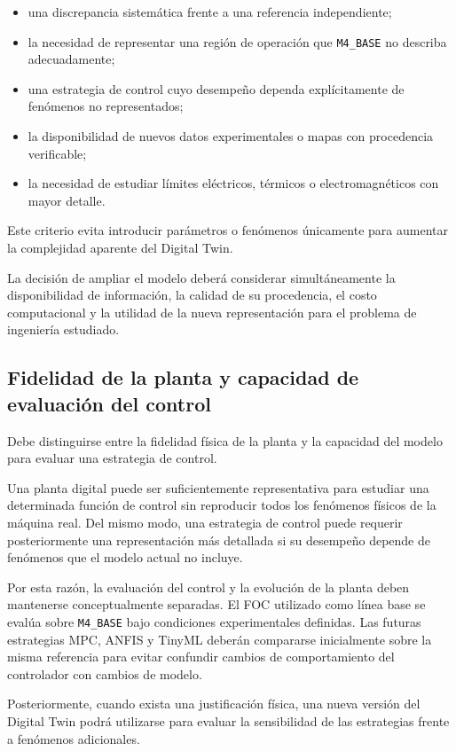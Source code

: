 \begin{itemize}
\item una discrepancia sistemática frente a una referencia independiente;
\item la necesidad de representar una región de operación que \texttt{M4\_BASE} no describa adecuadamente;
\item una estrategia de control cuyo desempeño dependa explícitamente de fenómenos no representados;
\item la disponibilidad de nuevos datos experimentales o mapas con procedencia verificable;
\item la necesidad de estudiar límites eléctricos, térmicos o electromagnéticos con mayor detalle.
\end{itemize}

Este criterio evita introducir parámetros o fenómenos únicamente para aumentar la complejidad aparente del Digital Twin.

La decisión de ampliar el modelo deberá considerar simultáneamente la disponibilidad de información, la calidad de su procedencia, el costo computacional y la utilidad de la nueva representación para el problema de ingeniería estudiado.

\subsection{Fidelidad de la planta y capacidad de evaluación del control}

Debe distinguirse entre la fidelidad física de la planta y la capacidad del modelo para evaluar una estrategia de control.

Una planta digital puede ser suficientemente representativa para estudiar una determinada función de control sin reproducir todos los fenómenos físicos de la máquina real. Del mismo modo, una estrategia de control puede requerir posteriormente una representación más detallada si su desempeño depende de fenómenos que el modelo actual no incluye.

Por esta razón, la evaluación del control y la evolución de la planta deben mantenerse conceptualmente separadas. El FOC utilizado como línea base se evalúa sobre \texttt{M4\_BASE} bajo condiciones experimentales definidas. Las futuras estrategias MPC, ANFIS y TinyML deberán compararse inicialmente sobre la misma referencia para evitar confundir cambios de comportamiento del controlador con cambios de modelo.

Posteriormente, cuando exista una justificación física, una nueva versión del Digital Twin podrá utilizarse para evaluar la sensibilidad de las estrategias frente a fenómenos adicionales.

